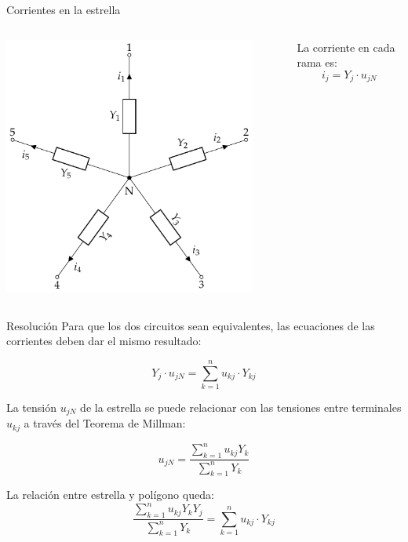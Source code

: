 \documentclass[aspectratio=169, usenames,svgnames,dvipsnames]{beamer}
\begin{document}
\begin{frame}[label={sec:org79e087f}]{Corrientes en la estrella}
\begin{columns}
\begin{column}{0.5\columnwidth}
\begin{center}
\includegraphics[width=0.9\textwidth]{../figs/Rosen_Y.pdf}
\end{center}
\end{column}

\begin{column}{0.5\columnwidth}
La corriente en cada rama es:
\[
  i_j = Y_j \cdot u_{jN}
\]
\end{column}
\end{columns}
\end{frame}

\begin{frame}[label={sec:org5255151}]{Resolución}
Para que los dos circuitos sean equivalentes, las ecuaciones de las corrientes deben dar el mismo resultado:

\[
  Y_j \cdot u_{jN} = \sum_{k = 1}^n u_{kj} \cdot Y_{kj}  
\]

La tensión \(u_{jN}\) de la estrella se puede relacionar con las tensiones entre terminales \(u_{kj}\) a través del Teorema de Millman:

\[
  u_{jN} = \frac{\sum_{k = 1}^n u_{kj} Y_k}{\sum_{k  = 1}^n Y_k}
\]

La relación entre estrella y polígono queda:
\[
  \frac{\sum_{k = 1}^n u_{kj} Y_k Y_j}{\sum_{k  = 1}^n Y_k} = \sum_{k = 1}^n u_{kj} \cdot Y_{kj}  
\]
\end{frame}
\end{document}
